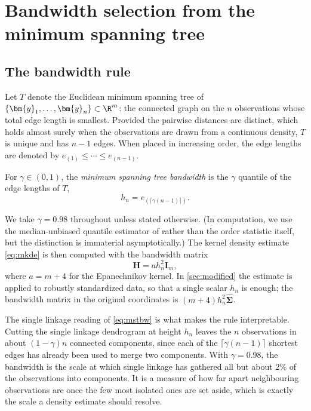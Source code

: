 \section{Bandwidth selection from the minimum spanning tree} \label{sec:mst}

\subsection{The bandwidth rule}

Let $T$ denote the Euclidean minimum spanning tree of $\{\bm{y}_1,\dots,\bm{y}_n\}\subset\R^m$: the connected graph on the $n$ observations whose total edge length is smallest. Provided the pairwise distances are distinct, which holds almost surely when the observations are drawn from a continuous density, $T$ is unique and has $n-1$ edges. When placed in increasing order, the edge lengths are denoted by $e_{(1)} \le \cdots \le e_{(n-1)}$.

\begin{defn}\label{def:mstbw}
  For $\gamma\in(0,1)$, the \emph{minimum spanning tree bandwidth} is the $\gamma$ quantile of the edge lengths of $T$,
  \begin{equation}\label{eq:mstbw}
    h_n = e_{(\lceil \gamma(n-1)\rceil)}.
  \end{equation}
\end{defn}
We take $\gamma = 0.98$ throughout unless stated otherwise. (In computation, we use the median-unbiased quantile estimator of \citet{HF96} rather than the order statistic itself, but the distinction is immaterial asymptotically.) The kernel density estimate \eqref{eq:mkde} is then computed with the bandwidth matrix
\begin{equation}\label{eq:Hmst}
  \bm{H} = ah_n^2\bm{I}_m,
\end{equation}
where $a=m+4$ for the Epanechnikov kernel. In \cref{sec:modified} the estimate is applied to robustly standardized data, so that a single scalar $h_n$ is enough; the bandwidth matrix in the original coordinates is $(m+4)h_n^2\hat{\bm{\Sigma}}$.

The single linkage reading of \eqref{eq:mstbw} is what makes the rule interpretable. Cutting the single linkage dendrogram at height $h_n$ leaves the $n$ observations in about $(1-\gamma)n$ connected components, since each of the $\lceil\gamma(n-1)\rceil$ shortest edges has already been used to merge two components. With $\gamma=0.98$, the bandwidth is the scale at which single linkage has gathered all but about 2\% of the observations into components. It is a measure of how far apart neighbouring observations are once the few most isolated ones are set aside, which is exactly the scale a density estimate should resolve.

